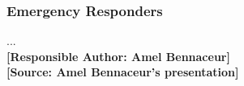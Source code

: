 \documentclass[sigconf]{acmart}
\begin{document}
\subsubsection{Emergency Responders} ...\\
\noindent\textbf{[Responsible Author:  Amel Bennaceur]}\\
\textbf{[Source: Amel Bennaceur's presentation] }\\\\
%
\end{document}
